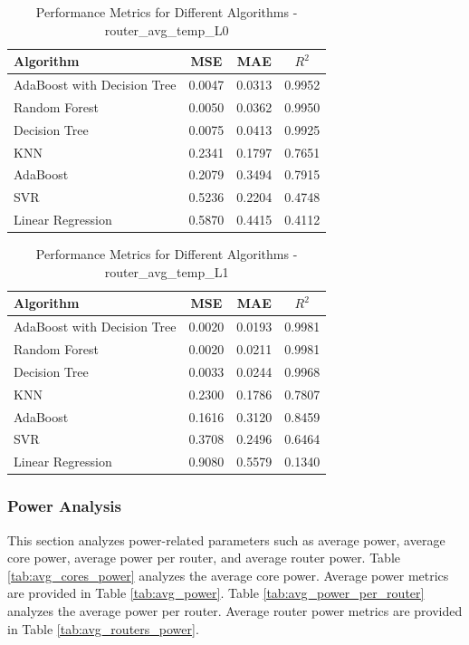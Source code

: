 \documentclass[conference]{IEEEtran}
\begin{document}
\begin{table}[htbp]
	\caption{Performance Metrics for Different Algorithms - router\_avg\_temp\_L0}
	\label{tab:router_avg_temp_L0}
	\begin{tabular}{lccc}
		\toprule
		\textbf{Algorithm} & \textbf{MSE} & \textbf{MAE} & \textbf{\(R^2\)} \\
		\midrule
		AdaBoost with Decision Tree & 0.0047 & 0.0313 & 0.9952 \\
		Random Forest & 0.0050 & 0.0362 & 0.9950 \\
		Decision Tree & 0.0075 & 0.0413 & 0.9925 \\
		KNN & 0.2341 & 0.1797 & 0.7651 \\
		AdaBoost & 0.2079 & 0.3494 & 0.7915 \\
		SVR & 0.5236 & 0.2204 & 0.4748 \\
		Linear Regression & 0.5870 & 0.4415 & 0.4112 \\
		\bottomrule
	\end{tabular}
\end{table}


\begin{table}[htbp]
	\caption{Performance Metrics for Different Algorithms - router\_avg\_temp\_L1}
	\label{tab:router_avg_temp_L1}
	\begin{tabular}{lccc}
		\toprule
		\textbf{Algorithm} & \textbf{MSE} & \textbf{MAE} & \textbf{\(R^2\)} \\
		\midrule
		AdaBoost with Decision Tree & 0.0020 & 0.0193 & 0.9981 \\
		Random Forest & 0.0020 & 0.0211 & 0.9981 \\
		Decision Tree & 0.0033 & 0.0244 & 0.9968 \\
		KNN & 0.2300 & 0.1786 & 0.7807 \\
		AdaBoost & 0.1616 & 0.3120 & 0.8459 \\
		SVR & 0.3708 & 0.2496 & 0.6464 \\
		Linear Regression & 0.9080 & 0.5579 & 0.1340 \\
		\bottomrule
	\end{tabular}
\end{table}
	
	\subsubsection{Power Analysis}
	This section analyzes power-related parameters such as average power, average core power, average power per router, and average router power. Table \ref{tab:avg_cores_power} analyzes the average core power. Average power metrics are provided in Table \ref{tab:avg_power}. Table \ref{tab:avg_power_per_router} analyzes the average power per router. Average router power metrics are provided in Table \ref{tab:avg_routers_power}.
\end{document}
